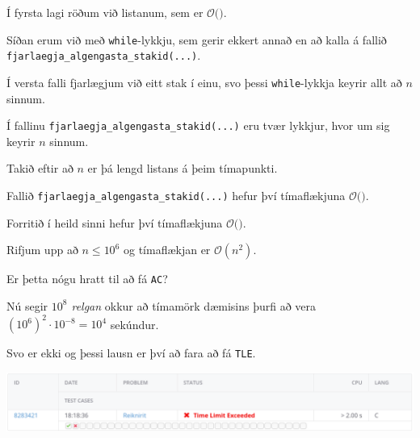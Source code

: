 {
	{
		\item<1-> Í fyrsta lagi röðum við listanum, sem er $\mathcal{O}($\onslide<2->{$n \log n$}$)$.
		\item<3-> Síðan erum við með \texttt{while}-lykkju, sem gerir ekkert annað en að kalla á fallið \texttt{fjarlaegja\_algengasta\_stakid(...)}.
		\item<4-> Í versta falli fjarlægjum við eitt stak í einu, svo þessi \texttt{while}-lykkja keyrir allt að $n$ sinnum.
		\item<5-> Í fallinu \texttt{fjarlaegja\_algengasta\_stakid(...)} eru tvær lykkjur, hvor um sig keyrir $n$ sinnum.
		\item<6-> Takið eftir að $n$ er þá lengd listans á þeim tímapunkti.
		\item<7-> Fallið \texttt{fjarlaegja\_algengasta\_stakid(...)} hefur því tímaflækjuna $\mathcal{O}($\onslide<8->{$\ n\ $}$)$.
		\item<9-> Forritið í heild sinni hefur því tímaflækjuna $\mathcal{O}($\onslide<10->{$n^2$}$)$.
	}
}

{
	{
		\item<1-> Rifjum upp að $n \leq 10^6$ og tímaflækjan er $\mathcal{O}(n^2)$.
		\item<2-> Er þetta nógu hratt til að fá \texttt{AC}?
		\item<3-> Nú segir \emph{$10^8$ relgan} okkur að tímamörk dæmisins þurfi að vera $(10^6)^2 \cdot 10^{-8} = 10^4$ sekúndur.
		\item<4-> Svo er ekki og þessi lausn er því að fara að fá \texttt{TLE}.
		\item<5->[] \includegraphics[scale = 0.25]{fig/tle}
	}
}

{
}


